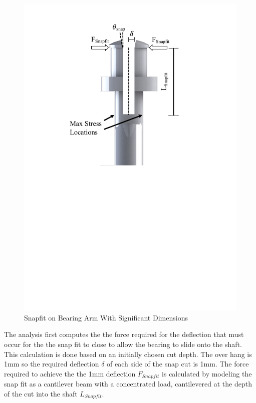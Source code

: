 \documentclass[../main.tex]{subfiles}
\begin{document}
\begin{figure}[H]
	\centering
	\includegraphics[width=1\textwidth]{img/gondola/Snapfit.pdf}
	\caption{Snapfit on Bearing Arm With Significant Dimensions }
	\label{fig:Snapfit}
\end{figure}

The analysis first computes the the force required for the deflection that must occur for the the snap fit to close to allow the bearing to slide onto the shaft. This calculation is done based on an initially chosen cut depth. The over hang is 1mm so the required deflection $\delta$ of each side of the snap cut is 1mm. The force required to achieve the the 1mm deflection $F_{Snapfit}$ is calculated by modeling the snap fit as a cantilever beam with a concentrated load, cantilevered at the depth of the cut into the shaft $L_{Snapfit}$. 
\end{document}
